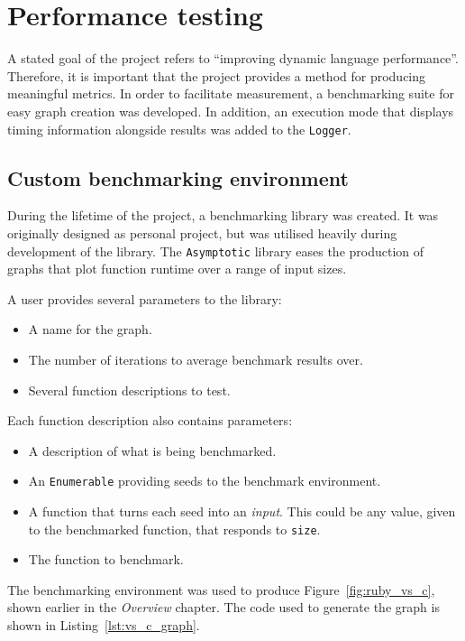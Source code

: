 \section{Performance testing}
A stated goal of the project refers to ``improving dynamic language performance''.
Therefore, it is important that the project provides a method for producing meaningful metrics.
In order to facilitate measurement, a benchmarking suite for easy graph creation was developed.
In addition, an execution mode that displays timing information alongside results was added to the \verb|Logger|.

\subsection{Custom benchmarking environment}
During the lifetime of the project, a benchmarking library was created. It was originally designed as personal project, but was utilised heavily during development of the library.  The \verb|Asymptotic| library eases the production of graphs that plot function runtime over a range of input sizes.

A user provides several parameters to the library:
\begin{itemize}
\item A name for the graph.
\item The number of iterations to average benchmark results over.
\item Several function descriptions to test.
\end{itemize}

Each function description also contains parameters:
\begin{itemize}
\item A description of what is being benchmarked.
\item An \verb|Enumerable| providing seeds to the benchmark environment.
\item A function that turns each seed into an \emph{input}. This could be any value, given to the benchmarked function, that responds to \verb|size|.
\item The function to benchmark.
\end{itemize}

The benchmarking environment was used to produce Figure~\ref{fig:ruby_vs_c}, shown earlier in the \emph{Overview} chapter. The code used to generate the graph is shown in Listing~\ref{lst:vs_c_graph}.

